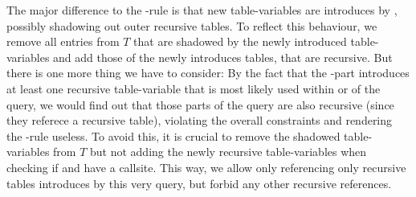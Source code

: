 The major difference to the \REXPR-rule is that new table-variables are introduces by \FROM, possibly shadowing out outer recursive tables. To reflect this behaviour, we remove all entries from $T$ that are shadowed by the newly introduced table-variables and add those of the newly introduces tables, that are recursive.
But there is one more thing we have to consider: By the fact that the \FROM-part introduces at least one recursive table-variable that is most likely used within \SELECT or \WHERE of the query, we would find out that those parts of the query are also recursive (since they referece a recursive table), violating the overall constraints and rendering the \FROM-rule useless. To avoid this, it is crucial to remove the shadowed table-variables from $T$ but not adding the newly recursive table-variables when checking if \SELECT and \WHERE have a callsite. This way, we allow only referencing only recursive tables introduces by this very query, but forbid any other recursive references.
\iffalse OLD
$$\quad(\textsc{from})\inferrule{
    \exists i \in \{1, ..., n\}: T \vdash \hasCallsite(e_{f_i}) \\
    T[a_1 \mapsto \bot, ..., a_n \mapsto \bot] \vdash \neg \hasCallsite(e_s) \land \neg \hasCallsite(e_w) \\
    \forall i \in \{1, ..., n\}: T, \varnothing \vdash (\TRUE, t_i) \rightarrow (B_i, R_i)
}{
    T, \varnothing \vdash (p, \SELECT e_s \FROM t_1 \AS a_1 \otimes ... \otimes  t_n \AS a_n \WHERE e_w) \rightarrow \\\\
    {\begin{tabular}[b]{LLLL}
    (~~&\{&(&\SELECT p ~\AND~ p_1 ~\AND~ \cdots ~\AND~ p_n, \\
          &&&\SELECT e_s \FROM t'_1 \AS a_1 \otimes ... \otimes  t'_n \AS a_n \WHERE e_w ~~)\\
      && | &~((p_1, t'_1), ..., (p_n, t'_n)) \in \times_{\{i|1\leq i \leq n\}} B_i\}, \\
    &\{&(&\SELECT p_1 ~\AND~ \cdots ~\AND~ p_n, \\
       &&&\SELECT e_s \FROM t'_1 \AS a_1 \otimes ... \otimes  t'_n \AS a_n \WHERE e_w ~~)\\
       &&| &~ ((p_1, t'_1), ..., (p_n, t'_n)) \in \times_{\{i|1\leq i \leq n\}} (B_i \cup R_i), \exists t' \in \{t'_1, ..., t'_n\} : \hasCallsite(t')\})\\
    \end{tabular}}
}$$
\fi
